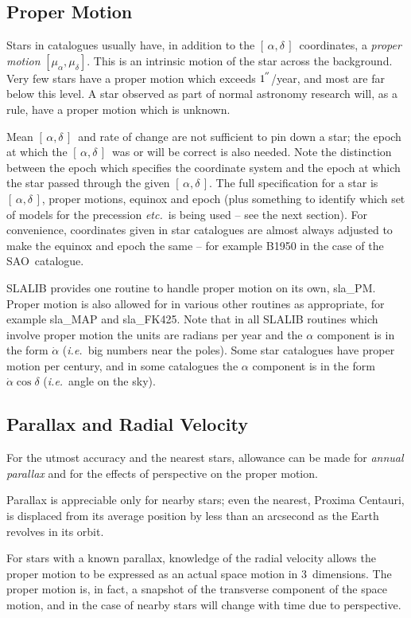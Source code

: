 \documentclass[11pt,twoside]{article}
\newcommand{\radec}     {$[\,\alpha,\delta\,]$}
\newcommand{\arcseci}[1] {$#1\hspace{-0.05em}$\raisebox{-0.5ex}
                         {$^{'\hspace{-0.1em}'}$}}
\renewcommand{\arcseci}[1] {$#1\hspace{-0.05em}^{'\hspace{-0.1em}'}$}
\begin{document}
\subsection{Proper Motion}
Stars in catalogues usually have, in addition to the
\radec\  coordinates, a {\it proper motion} $[\mu_\alpha,\mu_\delta]$.
This is an intrinsic motion
of the star across the background.  Very few stars have a
proper motion which exceeds \arcseci{1}/year, and most are
far below this level.  A star observed as part of normal
astronomy research will, as a rule, have a proper motion
which is unknown.

Mean \radec\ and rate of change are not sufficient to pin
down a star;  the epoch at which the \radec\ was or will
be correct is also needed.  Note the distinction
between the epoch which specifies the
coordinate system and the epoch at which the star passed
through the given \radec.  The full specification for a star
is \radec, proper motions, equinox and epoch (plus something to
identify which set of models for the precession {\it etc.}\ is
being used -- see the next section).
For convenience, coordinates given in star catalogues are almost
always adjusted to make the equinox and epoch the same -- for
example B1950 in the case of the SAO~catalogue.

SLALIB provides one routine to handle proper motion on its own,
sla\_PM.
Proper motion is also allowed for in various other
routines as appropriate, for example
sla\_MAP
and
sla\_FK425.
Note that in all SLALIB routines which involve proper motion
the units are radians per year and the
$\alpha$ component is in the form $\dot{\alpha}$ ({\it i.e.}\ big
numbers near the poles).
Some star catalogues have proper motion per century, and
in some catalogues the $\alpha$ component is in the form
$\dot{\alpha}\cos\delta$ ({\it i.e.}\ angle on the sky).

\subsection{Parallax and Radial Velocity}
For the utmost accuracy and the nearest stars, allowance can
be made for {\it annual parallax}\/ and for the effects of perspective
on the proper motion.

Parallax is appreciable only for nearby stars;  even
the nearest, Proxima Centauri, is displaced from its average
position by less than
an arcsecond as the Earth revolves in its orbit.

For stars with a known parallax, knowledge of the radial velocity
allows the proper motion to be expressed as an actual space
motion in 3~dimensions.  The proper motion is,
in fact, a snapshot of the transverse component of the
space motion, and in the case of nearby stars will
change with time due to perspective.
\end{document}
